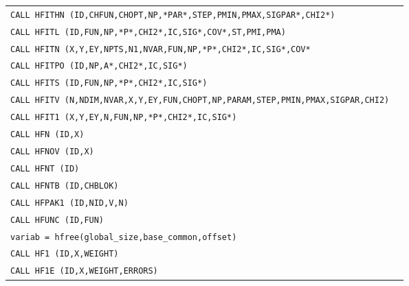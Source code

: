 \begin{longtable}{|>{\tt}p{.9\linewidth}r|}
CALL     HFITHN (ID,CHFUN,CHOPT,NP,*PAR*,STEP,PMIN,PMAX,SIGPAR*,CHI2*)
&                                                       \pageref{HFITHN} \\
CALL     HFITL  (ID,FUN,NP,*P*,CHI2*,IC,SIG*,COV*,ST,PMI,PMA)
&                                                       \pageref{HFITL}  \\
CALL     HFITN  (X,Y,EY,NPTS,N1,NVAR,FUN,NP,*P*,CHI2*,IC,SIG*,COV*
&                                                       \pageref{HFITN}  \\
CALL     HFITPO (ID,NP,A*,CHI2*,IC,SIG*)     
&                                                       \pageref{HFITPO} \\
CALL     HFITS  (ID,FUN,NP,*P*,CHI2*,IC,SIG*)
&                                                       \pageref{HFITS}  \\
CALL     HFITV  (N,NDIM,NVAR,X,Y,EY,FUN,CHOPT,NP,PARAM,STEP,PMIN,PMAX,SIGPAR,CHI2)
&                                                       \pageref{HFITV}  \\
CALL     HFIT1  (X,Y,EY,N,FUN,NP,*P*,CHI2*,IC,SIG*)
&                                                       \pageref{HFIT1}  \\
CALL     HFN    (ID,X)                       
&                                                       \pageref{HFN}    \\
CALL     HFNOV  (ID,X)                       
&                                                       \pageref{HFNOV}  \\
CALL     HFNT   (ID)                         
&                                                       \pageref{HFNT}   \\
CALL     HFNTB  (ID,CHBLOK)                         
&                                                       \pageref{HFNTB}  \\
CALL     HFPAK1 (ID,NID,V,N)                 
&                                                       \pageref{HFPAK1} \\
CALL     HFUNC  (ID,FUN)                     
&                                                       \pageref{HFUNC}  \\
variab = hfree(global\_size,base\_common,offset)
&                                                       \pageref{hfree}  \\
CALL     HF1    (ID,X,WEIGHT)                
&                                                       \pageref{HF1}    \\
CALL     HF1E   (ID,X,WEIGHT,ERRORS)                
&                                                       \pageref{HF1E}   \\

\end{longtable}
